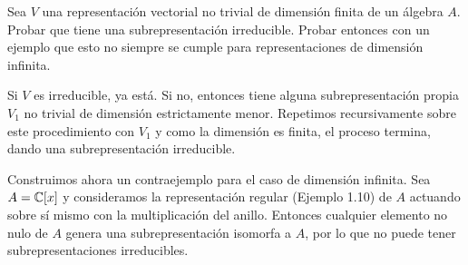\documentclass[twoside]{article}
\begin{document}
\begin{ejercicio}{1.20}
Sea $V$ una representación vectorial no trivial de dimensión finita de un álgebra $A$. Probar que tiene una subrepresentación irreducible. Probar entonces con un ejemplo que esto no siempre se cumple para representaciones de dimensión infinita.
\end{ejercicio}
\begin{solucion}
Si $V$ es irreducible, ya está. Si no, entonces tiene alguna subrepresentación propia $V_1$ no trivial de dimensión estrictamente menor. Repetimos recursivamente sobre este procedimiento con $V_1$ y como la dimensión es finita, el proceso termina, dando una subrepresentación irreducible.

Construimos ahora un contraejemplo para el caso de dimensión infinita. Sea $A=\mathbb{C}[x]$ y consideramos la representación regular (Ejemplo 1.10) de $A$ actuando sobre sí mismo con la multiplicación del anillo. Entonces cualquier elemento no nulo de $A$ genera una subrepresentación isomorfa a $A$, por lo que no puede tener subrepresentaciones irreducibles. 

%
%
\end{solucion}

\newpage
\end{document}
